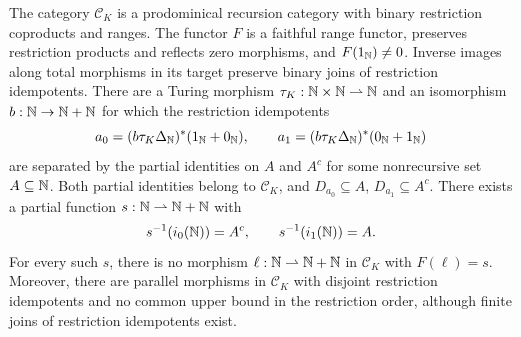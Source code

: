 \begin{proposition}\label{prop:missing-lift}
The category $\mathcal C_K$ is a prodominical recursion category with
binary restriction coproducts and ranges. The functor $F$ is a faithful range functor, preserves restriction products and
reflects zero morphisms, and $F(1_{\mathbb N})\ne0$. Inverse images along
total morphisms in its target preserve binary joins of restriction idempotents.
There are a Turing morphism
$\tau_K:\mathbb N\times\mathbb N\rightharpoonup\mathbb N$ and an isomorphism
$b:\mathbb N\to\mathbb N+\mathbb N$ for which the restriction idempotents
\[
 a_0=(b\tau_K\Delta_{\mathbb N})^*(1_{\mathbb N}+0_{\mathbb N}),\qquad
 a_1=(b\tau_K\Delta_{\mathbb N})^*(0_{\mathbb N}+1_{\mathbb N})
\]
are separated by the partial identities on $A$ and $A^c$ for some
nonrecursive set $A\subseteq\mathbb N$. Both partial identities belong to
$\mathcal C_K$, and $D_{a_0}\subseteq A$, $D_{a_1}\subseteq A^c$.
There exists a partial function $s:\mathbb N\rightharpoonup\mathbb N+\mathbb N$ with
\[
 s^{-1}(i_0(\mathbb N))=A^c,\qquad s^{-1}(i_1(\mathbb N))=A.
\]
For every such $s$, there is no morphism
$\ell:\mathbb N\rightharpoonup\mathbb N+\mathbb N$ in $\mathcal C_K$ with $F(\ell)=s$.
Moreover, there are parallel morphisms in $\mathcal C_K$
with disjoint restriction idempotents and no common upper bound in
the restriction order, although finite joins of restriction idempotents
exist.
\end{proposition}

